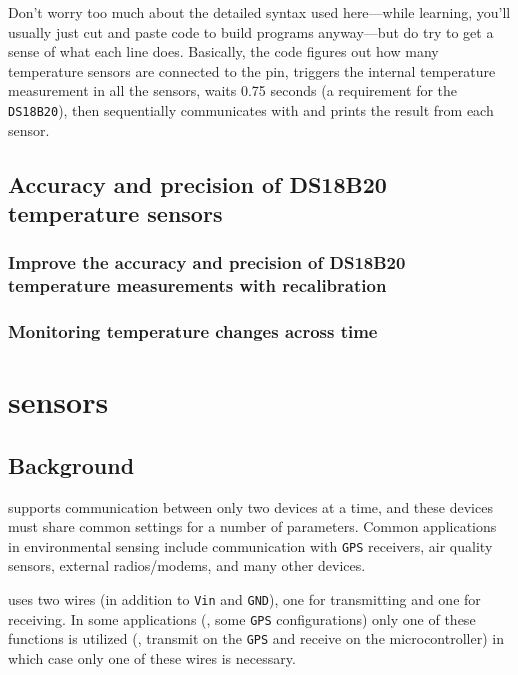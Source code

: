 Don’t worry too much about the detailed syntax used here—while learning, you’ll usually just cut and paste code to build programs anyway—but do try to get a sense of what each line does.
Basically, the code figures out how many temperature sensors are connected to the pin, triggers the internal temperature measurement in all the sensors,  waits 0.75 seconds (a requirement for the \texttt{DS18B20}), then sequentially communicates with and prints the result from each sensor.


\subsection{\color{gray} Accuracy and precision of DS18B20 temperature sensors \color{black}}
\subsubsection{\color{gray} Improve the accuracy and precision of DS18B20 temperature measurements with recalibration \color{black}}
\subsubsection{\color{gray} Monitoring temperature changes across time \color{black}}

\newpage

\section{\uart sensors}
\subsection{Background}
	\uart supports communication between only two devices at a time, and these devices must share common settings for a number of parameters. %
Common applications in environmental sensing include communication with \texttt{GPS} receivers, air quality sensors, external radios/modems, and many other devices. 

\uart uses two wires (in addition to \texttt{Vin} and \texttt{GND}), one for transmitting and one for receiving.
In some applications (\eg, some \texttt{GPS} configurations) only one of these functions is utilized (\eg, transmit on the \texttt{GPS} and receive on the microcontroller) in which case only one of these wires is necessary.

